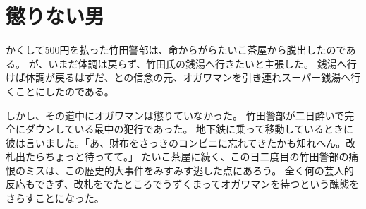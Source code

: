 \section{懲りない男}
かくして500円を払った竹田警部は、命からがらたいこ茶屋から脱出したのである。
が、いまだ体調は戻らず、竹田氏の銭湯へ行きたいと主張した。
銭湯へ行けば体調が戻るはずだ、との信念の元、オガワマンを引き連れスーパー銭湯へ行くことにしたのである。
\par
しかし、その道中にオガワマンは懲りていなかった。
竹田警部が二日酔いで完全にダウンしている最中の犯行であった。
地下鉄に乗って移動しているときに彼は言いました。「あ、財布をさっきのコンビニに忘れてきたかも知れへん。改札出たらちょっと待ってて。」
たいこ茶屋に続く、この日二度目の竹田警部の痛恨のミスは、この歴史的大事件をみすみす逃した点にあろう。
全く何の芸人的反応もできず、改札をでたところでうずくまってオガワマンを待つという醜態をさらすことになった。



